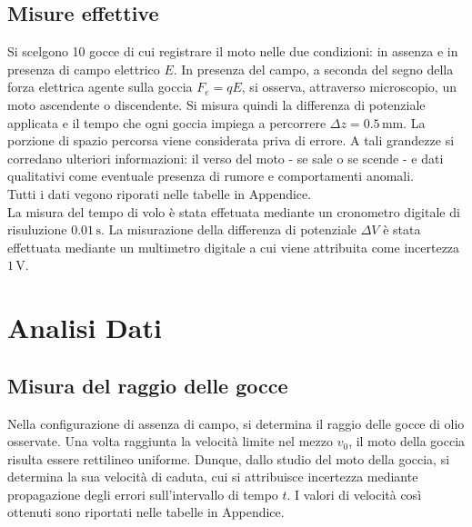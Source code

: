 \documentclass[]{article}
\let\oldsection\section%
\renewcommand{\section}{%
	\renewcommand{\theequation}{\thesection.\arabic{equation}}%
	\oldsection}%
\let\oldsubsection\subsection%
\renewcommand{\subsection}{%
	\renewcommand{\theequation}{\thesubsection.\arabic{equation}}%
	\oldsubsection}%
\begin{document}
    \subsection {Misure effettive}
    Si scelgono 10 gocce di cui registrare il moto nelle due condizioni: in assenza e in presenza di campo elettrico $ E $. In presenza del campo, a seconda del segno della forza elettrica agente sulla goccia $F_e = qE$, si osserva, attraverso microscopio, un moto ascendente o discendente. Si misura quindi la differenza di potenziale applicata e il tempo che ogni goccia impiega a percorrere $ \Delta z = 0.5 \, \text{mm} $. La porzione di spazio percorsa viene considerata priva di errore. A tali grandezze si corredano ulteriori informazioni: il verso del moto - se sale o se scende - e dati qualitativi come eventuale presenza di rumore e comportamenti anomali. \\
    Tutti i dati vegono riporati nelle tabelle in Appendice. \\ 
    La misura del tempo di volo è stata effetuata mediante un cronometro digitale di risuluzione $ 0.01 \, \text{s} $. La misurazione della differenza di potenziale $ \Delta V $ è stata effettuata mediante un multimetro digitale a cui viene attribuita come incertezza $ 1 \, \text{V} $.


    \section{Analisi Dati}
    \subsection{Misura del raggio delle gocce}
    Nella configurazione di assenza di campo, si determina il raggio delle gocce di olio osservate.
    Una volta raggiunta la velocità limite nel mezzo $v_0$, il moto della goccia risulta essere rettilineo uniforme. Dunque, dallo studio del moto della goccia, si determina la sua velocità di caduta, cui si attribuisce incertezza mediante propagazione degli errori sull'intervallo di tempo $t$. I valori di velocità così ottenuti sono riportati nelle tabelle in Appendice.
\end{document}
